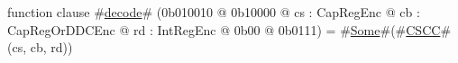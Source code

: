 function clause #\hyperref[sailMIPSzdecode]{decode}# (0b010010 @ 0b10000 @ cs : CapRegEnc @ cb : CapRegOrDDCEnc @ rd : IntRegEnc @ 0b00 @ 0b0111) = #\hyperref[sailMIPSzSome]{Some}#(#\hyperref[sailMIPSzCSCC]{CSCC}#(cs, cb, rd))
